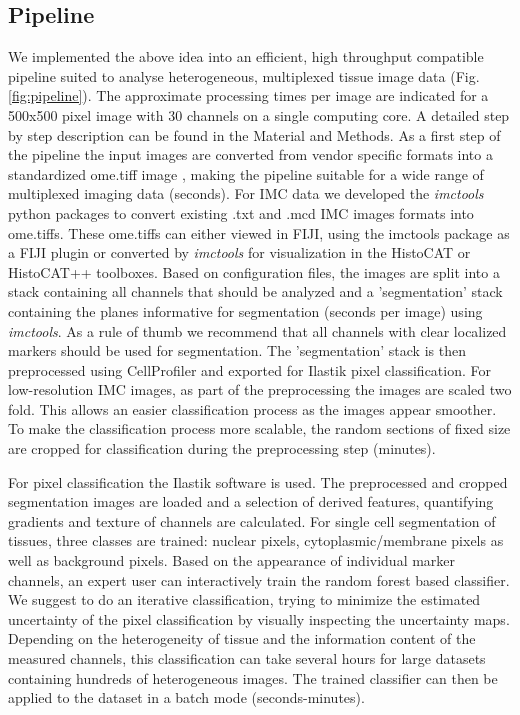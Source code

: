 \documentclass[a4paper]{article}
\begin{document}
\subsection{Pipeline}
We implemented the above idea into an efficient, high throughput compatible pipeline suited to
analyse heterogeneous, multiplexed tissue image data (Fig. \ref{fig:pipeline}).
The approximate processing times per image are indicated for a 500x500 pixel image with 30
channels on a single computing core. A detailed step by step description can be found in the
Material and Methods.
As a first step of the pipeline the input
images are converted from vendor specific formats into a standardized ome.tiff image \cite{goldberg_open_2005}, making the pipeline suitable for a wide range of multiplexed imaging data (\texttildelow seconds). For
IMC data we developed the \textit{imctools} python packages to convert existing .txt and .mcd IMC images
formats into ome.tiffs. These ome.tiffs can either viewed in FIJI, using the imctools package as a
FIJI plugin or converted by \textit{imctools} for visualization in the HistoCAT or HistoCAT++
toolboxes.
Based on configuration files, the images are split into a stack containing all channels that should
be analyzed and a 'segmentation' stack containing the planes informative for segmentation
(\texttildelow seconds per image) using \textit{imctools}. As a rule of thumb we
recommend that all channels with clear localized markers should be used for segmentation.
The 'segmentation' stack is then preprocessed using CellProfiler and exported for Ilastik pixel
classification. For low-resolution IMC images, as part of the preprocessing the images are scaled
two fold. This allows an easier classification process as the images appear smoother. To make the
classification process more scalable, the random sections of fixed size are cropped for
classification during the preprocessing step (\texttildelow minutes).

For pixel classification the Ilastik software is used. The preprocessed and cropped segmentation
images are loaded and a selection of derived features, quantifying gradients and texture of
channels are calculated. For single cell segmentation of tissues, three classes are trained:
nuclear pixels, cytoplasmic/membrane pixels as well as background pixels. Based on the appearance
of individual marker channels, an expert user can interactively train the random forest based
classifier. We suggest to do an
iterative classification, trying to minimize the estimated uncertainty of the pixel classification
by visually inspecting the uncertainty maps.
Depending on the heterogeneity of tissue and the information content of the measured channels, this
classification can take several hours for large datasets containing hundreds of heterogeneous
images.
The trained classifier can then be applied to the dataset in a batch mode (\texttildelow seconds-minutes).
\end{document}
